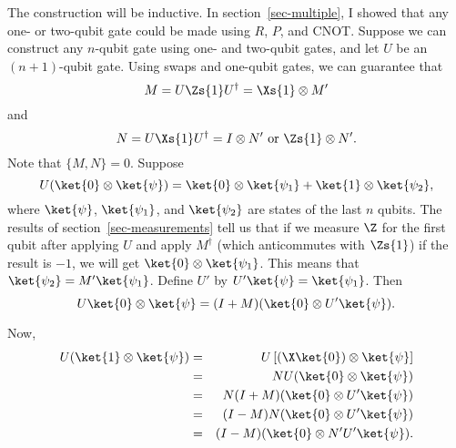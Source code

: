 The construction will be inductive.  In section~\ref{sec-multiple}, I showed
that any one- or two-qubit gate could be made using $R$, $P$, and CNOT.
Suppose we can construct any $n$-qubit gate using one- and two-qubit
gates, and let $U$ be an $(n+1)$-qubit gate.  Using swaps and one-qubit
gates, we can guarantee that
\begin{equation}
	M = U \Zs{1} U^\dagger = \Xs{1} \otimes M'
\end{equation}
and
\begin{equation}
	N = U \Xs{1} U^\dagger = I \otimes N'\ {\rm or}\ \Zs{1} \otimes N'.
\end{equation}
Note that $\{M, N\} = 0$.  Suppose
\begin{equation}
	U (\ket{0} \otimes \ket{\psi}) = \ket{0} \otimes \ket{\psi_1} + \ket{1}
	\otimes \ket{\psi_2},
\end{equation}
where $\ket{\psi}$, $\ket{\psi_1}$, and $\ket{\psi_2}$ are states of the
last $n$ qubits.  The results of section~\ref{sec-measurements} tell us that
if we measure $\Z$ for the first qubit after applying $U$ and apply
$M^\dagger$ (which anticommutes with $\Zs{1}$) if the result is $-1$, we
will get $\ket{0} \otimes \ket{\psi_1}$.  This means that $\ket{\psi_2} =
M' \ket{\psi_1}$.  Define $U'$ by $U' \ket{\psi} = \ket{\psi_1}$.  Then
\begin{equation}
	U \ket{0} \otimes \ket{\psi} = (I + M) (\ket{0} \otimes U' \ket{\psi}).
\end{equation}

Now,
\begin{eqnarray}
	U (\ket{1} \otimes \ket{\psi}) & = & U \left[ (\X \ket{0}) \otimes
	\ket{\psi} \right] \\
	& = & N U (\ket{0} \otimes \ket{\psi}) \\
	& = & N (I + M) (\ket{0} \otimes U' \ket{\psi}) \\
	& = & (I - M) N (\ket{0} \otimes U' \ket{\psi}) \\
	& = & (I- M) (\ket{0} \otimes N' U' \ket{\psi}).
\end{eqnarray}

